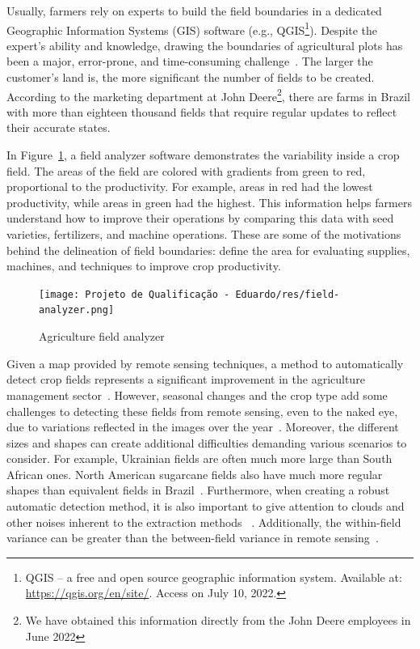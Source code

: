 \documentclass[12pt]{article}
\begin{document}
Usually, farmers rely on experts to build the field boundaries in a dedicated Geographic Information Systems (GIS) software (e.g., QGIS\footnote{QGIS -- a free and open source geographic information system. Available at: \url{https://qgis.org/en/site/}. Access on July 10, 2022.}). Despite the expert's ability and knowledge, drawing the boundaries of agricultural plots has been a major, error-prone, and time-consuming challenge~\cite{wagner2020}. The larger the customer's land is, the more significant the number of fields to be created. According to the marketing department at John Deere\footnote{We have obtained this information directly from the John Deere employees in June 2022}, there are farms in Brazil with more than eighteen thousand fields that require regular updates to reflect their accurate states. 

In Figure~\ref{figure:fieldanalyzer}, a field analyzer software demonstrates the variability inside a crop field. The areas of the field are colored with gradients from green to red, proportional to the productivity. For example, areas in red had the lowest productivity, while areas in green had the highest. This information helps farmers understand how to improve their operations by comparing this data with seed varieties, fertilizers, and machine operations. These are some of the motivations behind the delineation of field boundaries: define the area for evaluating supplies, machines, and techniques to improve crop productivity.

\begin{figure}[ht]
\centering
\texttt{[image: Projeto de Qualificação - Eduardo/res/field-analyzer.png]}
\caption{\label{figure:fieldanalyzer}Agriculture field analyzer\protect\footnotemark}
\end{figure}

Given a map provided by remote sensing techniques, a method to automatically detect crop fields represents a significant improvement in the agriculture management sector~\citep{garcia2017,garcia2018,garcia2019}. However, seasonal changes and the crop type add some challenges to detecting these fields from remote sensing, even to the naked eye, due to variations reflected in the images over the year~\citep{north2019}. Moreover, the different sizes and shapes can create additional difficulties demanding various scenarios to consider. For example, Ukrainian fields are often much more large than South African ones. North American sugarcane fields also have much more regular shapes than equivalent fields in Brazil~\cite{waldner2020}. Furthermore, when creating a robust automatic detection method, it is also important to give attention to clouds and other noises inherent to the extraction methods ~\citep{graesser2017,north2019}. Additionally, the within-field variance can be greater than the between-field variance in remote sensing~\cite{evans2002}.
\end{document}
